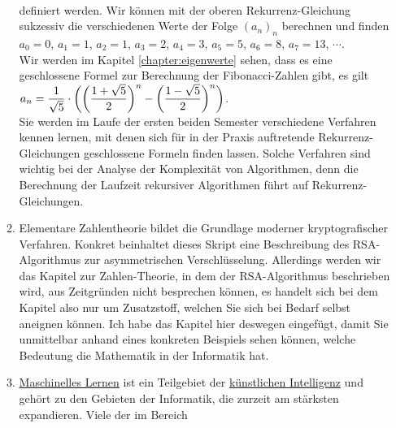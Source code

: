\begin{enumerate}
\begin{enumerate}
            \\[0.2cm]
            definiert werden.  Wir k\"{o}nnen mit der oberen Rekurrenz-Gleichung sukzessiv die verschiedenen
            Werte der Folge $(a_n)_n$ berechnen und finden 
            \\[0.2cm]
            \hspace*{1.3cm}
            $a_0 = 0$, $a_1 = 1$, $a_2 = 1$, $a_3 = 2$, $a_4 = 3$, $a_5 = 5$, $a_6 = 8$, $a_7 = 13$, $\cdots$.
            \\[0.2cm]
            Wir werden im Kapitel \ref{chapter:eigenwerte} sehen, dass es eine geschlossene Formel zur Berechnung der Fibonacci-Zahlen
            gibt, es gilt
            \\[0.2cm]
            \hspace*{1.3cm}
            $\displaystyle a_n = \frac{1}{\sqrt{5}} \cdot 
            \left( 
                  \biggl(\frac{1 + \sqrt{5}}{2}\biggr)^n - \biggl(\frac{1 - \sqrt{5}}{2}\biggr)^n 
            \right)
            $.
            \\[0.2cm]
            Sie werden im Laufe der ersten beiden Semester verschiedene Verfahren kennen lernen, mit
            denen sich f\"{u}r in der Praxis auftretende Rekurrenz-Gleichungen geschlossene Formeln
            finden lassen.  Solche Verfahren sind wichtig bei der Analyse der Komplexit\"{a}t von
            Algorithmen, denn die Berechnung der Laufzeit rekursiver Algorithmen f\"{u}hrt auf
            Rekurrenz-Gleichungen.   
      \item Elementare Zahlentheorie bildet die Grundlage moderner kryptografischer Verfahren.
            Konkret beinhaltet dieses Skript eine Beschreibung des RSA-Algorithmus zur asymmetrischen
            Verschl\"{u}sselung.  Allerdings werden wir das Kapitel zur Zahlen-Theorie, in dem der 
            RSA-Algorithmus beschrieben wird, aus Zeitgr\"{u}nden nicht besprechen k\"{o}nnen, es handelt
            sich bei dem Kapitel also nur um Zusatzstoff, welchen Sie sich bei Bedarf selbst aneignen
            k\"{o}nnen.  Ich habe das Kapitel hier deswegen eingef\"{u}gt, damit Sie unmittelbar anhand
            eines konkreten Beispiels sehen k\"{o}nnen, welche Bedeutung die Mathematik in der
            Informatik hat.
      \item \href{https://de.wikipedia.org/wiki/Maschinelles_Lernen}{Maschinelles Lernen} ist ein Teilgebiet 
            der \href{https://de.wikipedia.org/wiki/Künstliche_Intelligenz}{k\"{u}nstlichen Intelligenz} und geh\"{o}rt 
            zu den Gebieten der Informatik, die zurzeit am st\"{a}rksten expandieren.  Viele der im Bereich

\end{enumerate}
\end{enumerate}
